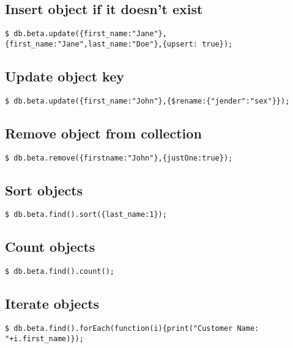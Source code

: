 \documentclass{article}
\begin{document}
\begin{multicols}{3}
\subsection{Insert object if it doesn't exist}
\lstinline|$ db.beta.update({first_name:"Jane"},{first_name:"Jane",last_name:"Doe"},{upsert: true});|
\subsection{Update object key}
\lstinline|$ db.beta.update({first_name:"John"},{$rename:{"jender":"sex"}});|
\subsection{Remove object from collection}
\lstinline|$ db.beta.remove({firstname:"John"},{justOne:true});|
\subsection{Sort objects}
\lstinline|$ db.beta.find().sort({last_name:1});|
\subsection{Count objects}
\lstinline|$ db.beta.find().count();|
\subsection{Iterate objects}
\lstinline|$ db.beta.find().forEach(function(i){print("Customer Name: "+i.first_name)});|
\end{multicols}
\end{document}
